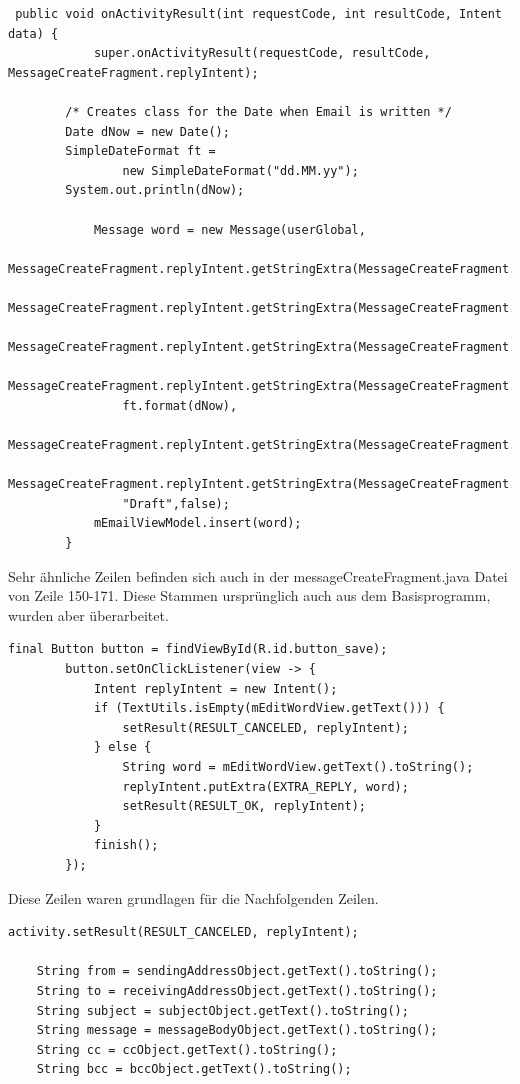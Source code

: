 \documentclass[a4paper,11pt]{article}
\begin{document}
\begin{appendices}
\lstset{language=java}
\begin{lstlisting}
 public void onActivityResult(int requestCode, int resultCode, Intent data) {
            super.onActivityResult(requestCode, resultCode, MessageCreateFragment.replyIntent);

        /* Creates class for the Date when Email is written */
        Date dNow = new Date();
        SimpleDateFormat ft =
                new SimpleDateFormat("dd.MM.yy");
        System.out.println(dNow);

            Message word = new Message(userGlobal,
                MessageCreateFragment.replyIntent.getStringExtra(MessageCreateFragment.EXTRA_TO),
                MessageCreateFragment.replyIntent.getStringExtra(MessageCreateFragment.EXTRA_CC),
                MessageCreateFragment.replyIntent.getStringExtra(MessageCreateFragment.EXTRA_BCC),
                MessageCreateFragment.replyIntent.getStringExtra(MessageCreateFragment.EXTRA_FROM),
                ft.format(dNow),
                MessageCreateFragment.replyIntent.getStringExtra(MessageCreateFragment.EXTRA_SUBJECT),
                MessageCreateFragment.replyIntent.getStringExtra(MessageCreateFragment.EXTRA_MESSAGE),
                "Draft",false);
            mEmailViewModel.insert(word);
        }
\end{lstlisting}

Sehr ähnliche Zeilen befinden sich auch in der messageCreateFragment.java Datei von Zeile 150-171. Diese Stammen ursprünglich auch aus dem Basisprogramm, 
wurden aber überarbeitet. 

\lstset{language=java}
\begin{lstlisting}
final Button button = findViewById(R.id.button_save);
        button.setOnClickListener(view -> {
            Intent replyIntent = new Intent();
            if (TextUtils.isEmpty(mEditWordView.getText())) {
                setResult(RESULT_CANCELED, replyIntent);
            } else {
                String word = mEditWordView.getText().toString();
                replyIntent.putExtra(EXTRA_REPLY, word);
                setResult(RESULT_OK, replyIntent);
            }
            finish();
        });
\end{lstlisting}

Diese Zeilen waren grundlagen für die Nachfolgenden Zeilen.

\lstset{language=java}
\begin{lstlisting}
activity.setResult(RESULT_CANCELED, replyIntent);

    String from = sendingAddressObject.getText().toString();
    String to = receivingAddressObject.getText().toString();
    String subject = subjectObject.getText().toString();
    String message = messageBodyObject.getText().toString();
    String cc = ccObject.getText().toString();
    String bcc = bccObject.getText().toString();



\end{lstlisting}
\end{appendices}
\end{document}
